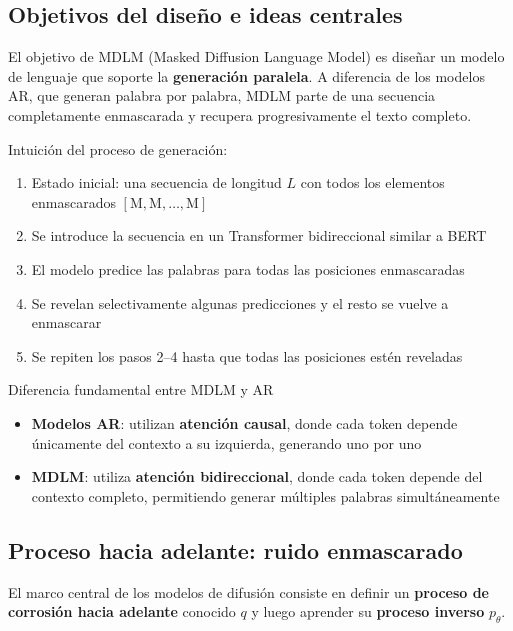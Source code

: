 \documentclass[a4paper]{article}
\begin{document}
\subsection{Objetivos del diseño e ideas centrales}

El objetivo de MDLM (Masked Diffusion Language Model) es diseñar un modelo de lenguaje que soporte la \textbf{generación paralela}. A diferencia de los modelos AR, que generan palabra por palabra, MDLM parte de una secuencia completamente enmascarada y recupera progresivamente el texto completo.

Intuición del proceso de generación:
\begin{enumerate}
    \item Estado inicial: una secuencia de longitud $L$ con todos los elementos enmascarados $[\text{M}, \text{M}, \ldots, \text{M}]$
    \item Se introduce la secuencia en un Transformer bidireccional similar a BERT
    \item El modelo predice las palabras para todas las posiciones enmascaradas
    \item Se revelan selectivamente algunas predicciones y el resto se vuelve a enmascarar
    \item Se repiten los pasos 2--4 hasta que todas las posiciones estén reveladas
\end{enumerate}

\begin{importantbox}{Diferencia fundamental entre MDLM y AR}
\begin{itemize}
    \item \textbf{Modelos AR}: utilizan \textbf{atención causal}, donde cada token depende únicamente del contexto a su izquierda, generando uno por uno
    \item \textbf{MDLM}: utiliza \textbf{atención bidireccional}, donde cada token depende del contexto completo, permitiendo generar múltiples palabras simultáneamente
\end{itemize}
\end{importantbox}

\subsection{Proceso hacia adelante: ruido enmascarado}

El marco central de los modelos de difusión consiste en definir un \textbf{proceso de corrosión hacia adelante} conocido $q$ y luego aprender su \textbf{proceso inverso} $p_\theta$.
\end{document}
